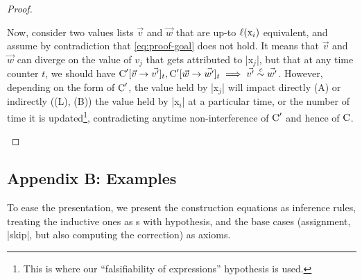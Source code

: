 \begin{proof}
\begin{description}
Now, consider two values lists \(\vec{v}\) and \(\vec{w}\) that are
up-to \ensuremath{\ell(\prc|x$_i$|)} equivalent, and assume by
contradiction that \autoref{eq:proof-goal} does not hold. It means that
\(\vec{v}\) and \(\vec{w}\) can diverge on the value of \(v_j\) that
gets attributed to \prc|x$_j$|, but that at any time counter \(t\),
we should have \(\prc|C|'[\vec{v} \rightarrow \vec{v'}]_t, \prc|C|'[\vec{w}
\rightarrow \vec{w'}]_t \implies \vec{v'}\upce{\scl{c}} \vec{w'}\). However,
depending on the form of \(\prc|C|'\), the value held by
\prc|x$_j$| will impact directly (A) or indirectly ((L), (B)) the
value held by \prc|x$_i$| at a particular time, or the number of time it is
updated\footnote{This is where our \enquote{falsifiability of expressions}
hypothesis is used.}, contradicting anytime
non-interference of $\prc|C|'$ and
hence of $\prc|C|$. \end{description}
\end{proof}

\subsection{Appendix B: Examples}\label{subsec:ni-examples}

To ease the presentation, we present the construction equations as inference
rules, treating the inductive ones as s with hypothesis, and
the base cases (assignment, \prc|skip|, but also computing the correction) as
axioms.

